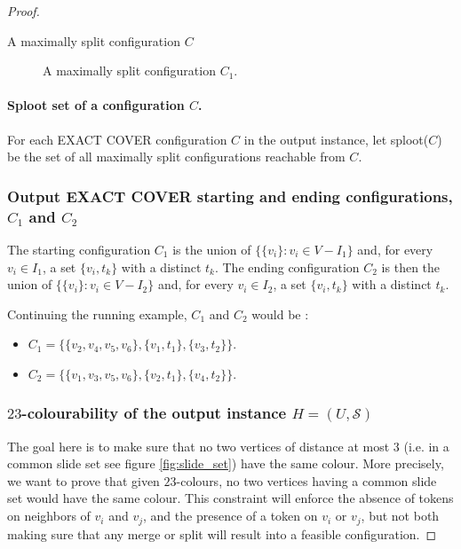 \begin{proof}
\begin{example}{A maximally split configuration $C$}
  \begin{figure}[h!]
    \begin{center}
      \begin{scaletikzpicturetowidth}{\textwidth}
      \end{scaletikzpicturetowidth}
    \end{center}
    \caption{A maximally split configuration $C_1$.}
    \label{}
  \end{figure}
\end{example}

\paragraph{Sploot set of a configuration $C$.}
For each EXACT COVER configuration $C$ in the output instance, let sploot($C$) be the set of all maximally split configurations reachable from $C$.

\subsubsection{Output EXACT COVER starting and ending configurations, $C_1$ and $C_2$}
The starting configuration $C_1$ is the union of $\{\{ v_i \} : v_i \in V - I_1\}$ and, for every $v_i \in I_1$, a set $\{v_i, t_k\}$ with a
distinct $t_k$.
The ending configuration $C_2$ is then the union of $\{\{ v_i \} : v_i \in V - I_2\}$ and, for every $v_i \in I_2$, a set $\{v_i, t_k\}$ with a
distinct $t_k$.

\begin{example}Continuing the running example, $C_1$ and $C_2$ would be :
\begin{itemize}
  \item $C_1 = \{ \{v_2, v_4, v_5, v_6\}, \{v_1, t_1\}, \{v_3, t_2\}\}$.
  \item $C_2 = \{ \{v_1, v_3, v_5, v_6\}, \{v_2, t_1\}, \{v_4, t_2\}\}$.
\end{itemize}
\end{example}

\subsubsection{$23$-colourability of the output instance $H = (U, \mathcal{S})$}\label{subsubsection:23_colorability}
The goal here is to make sure that no two vertices of distance at most $3$ (i.e. in a common slide set see figure \ref{fig:slide_set}) have the same
colour. More precisely, we want to prove that given $23$-colours, no two vertices having a common slide set would have the same colour.
This constraint will enforce the absence of tokens on neighbors of $v_i$ and $v_j$, and the presence of a token on $v_i$ or $v_j$, but not both
making sure that any merge or split will result into a feasible configuration.


\end{proof}
